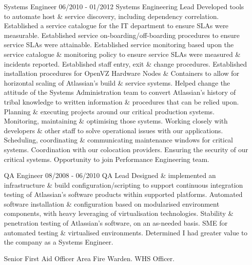  Systems Engineer
\lskip
{} 06/2010 - 01/2012
 Systems Engineering Lead
 Developed tools to automate host \& service discovery, including dependency correlation.
\dashtopic Established a service catalogue for the IT department to ensure SLAs were measurable.
\dashtopic Established service on-boarding/off-boarding procedures to ensure service SLAs were attainable.
\dashtopic Established service monitoring based upon the service catalogue \& monitoring policy to ensure service SLAs were measured \& incidents reported.
\dashtopic Established staff entry, exit \& change procedures.
\dashtopic Established installation procedures for OpenVZ Hardware Nodes \& Containers to allow for horizontal scaling of Atlassian's build \& service systems.
\dashtopic Helped change the attitude of the Systems Administration team to convert Atlassian's history of tribal knowledge to written information \& procedures that can be relied upon.
 Planning \& executing projects around our critical production systems.
\dashtopic Monitoring, maintaining \& optimising those systems.
\dashtopic Working closely with developers \& other staff to solve operational issues with our applications.
\dashtopic Scheduling, coordinating \& communicating maintenance windows for critical systems.
\dashtopic Coordination with our colocation providers.
\dashtopic Ensuring the security of our critical systems.
 Opportunity to join Performance Engineering team.
\pskip

 QA Engineer
\lskip
{} 08/2008 - 06/2010
 QA Lead
 Designed \& implemented an infrastructure \& build configuration/scripting to support continuous integration testing of Atlassian's software products within supported platforms. Automated software installation \& configuration based on modularised environment components, with heavy leveraging of virtualisation technologies.
 Stability \& penetration testing of Atlassian's software, on an as-needed basis.
\dashtopic SME for automated testing \& virtualised environments.
 Determined I had greater value to the company as a Systems Engineer.
\pskip

 Senior First Aid Officer
\lskip
\dashtopic Area Fire Warden.
\dashtopic WHS Officer.

\section{\DOT}

